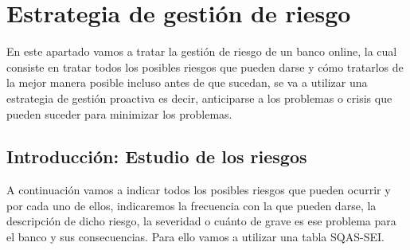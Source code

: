 \section{Estrategia de gestión de riesgo}
En este apartado vamos a tratar la gestión de riesgo de un banco online, la cual consiste en tratar todos los posibles riesgos que pueden darse y cómo tratarlos de la mejor manera posible incluso antes de que sucedan,  se va a utilizar una estrategia de gestión proactiva es decir, anticiparse a los problemas o crisis que pueden suceder para minimizar los problemas.

\subsection{Introducción: Estudio de los riesgos}
A continuación vamos a indicar todos los posibles riesgos que pueden ocurrir y por cada uno de ellos, indicaremos la frecuencia con la que pueden darse, la descripción de dicho riesgo, la severidad o cuánto de grave es ese problema para el banco y sus consecuencias.
Para ello vamos a utilizar una tabla SQAS-SEI.
